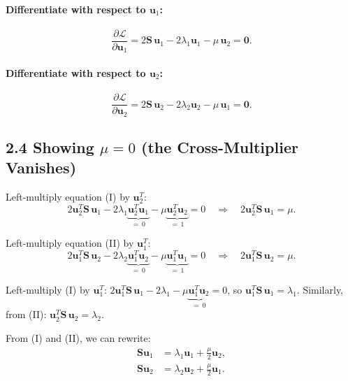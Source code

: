 \documentclass[11pt]{article}
\begin{document}
\paragraph{Differentiate with respect to $\boldsymbol{u}_1$:}
\[
\frac{\partial\mathcal{L}}{\partial\boldsymbol{u}_1}
= 2\boldsymbol{S}\,\boldsymbol{u}_1 - 2\lambda_1\boldsymbol{u}_1 - \mu\,\boldsymbol{u}_2
= \boldsymbol{0}.
\tag{I}
\]

\paragraph{Differentiate with respect to $\boldsymbol{u}_2$:}
\[
\frac{\partial\mathcal{L}}{\partial\boldsymbol{u}_2}
= 2\boldsymbol{S}\,\boldsymbol{u}_2 - 2\lambda_2\boldsymbol{u}_2 - \mu\,\boldsymbol{u}_1
= \boldsymbol{0}.
\tag{II}
\]

\subsection*{2.4 Showing $\mu = 0$ (the Cross-Multiplier Vanishes)}

Left-multiply equation (I) by $\boldsymbol{u}_2^T$:
\[
2\boldsymbol{u}_2^T\boldsymbol{S}\,\boldsymbol{u}_1
- 2\lambda_1\underbrace{\boldsymbol{u}_2^T\boldsymbol{u}_1}_{=\,0}
- \mu\underbrace{\boldsymbol{u}_2^T\boldsymbol{u}_2}_{=\,1} = 0
\quad\Longrightarrow\quad
2\boldsymbol{u}_2^T\boldsymbol{S}\,\boldsymbol{u}_1 = \mu.
\tag{III}
\]

Left-multiply equation (II) by $\boldsymbol{u}_1^T$:
\[
2\boldsymbol{u}_1^T\boldsymbol{S}\,\boldsymbol{u}_2
- 2\lambda_2\underbrace{\boldsymbol{u}_1^T\boldsymbol{u}_2}_{=\,0}
- \mu\underbrace{\boldsymbol{u}_1^T\boldsymbol{u}_1}_{=\,1} = 0
\quad\Longrightarrow\quad
2\boldsymbol{u}_1^T\boldsymbol{S}\,\boldsymbol{u}_2 = \mu.
\tag{IV}
\]

Left-multiply (I) by $\boldsymbol{u}_1^T$:
$2\boldsymbol{u}_1^T\boldsymbol{S}\,\boldsymbol{u}_1
- 2\lambda_1 - \mu\underbrace{\boldsymbol{u}_1^T\boldsymbol{u}_2}_{=\,0} = 0$,
so $\boldsymbol{u}_1^T\boldsymbol{S}\,\boldsymbol{u}_1 = \lambda_1$.
Similarly, from (II): $\boldsymbol{u}_2^T\boldsymbol{S}\,\boldsymbol{u}_2 = \lambda_2$.

From (I) and (II), we can rewrite:
\begin{align}
\boldsymbol{S}\boldsymbol{u}_1 &= \lambda_1\boldsymbol{u}_1 + \tfrac{\mu}{2}\boldsymbol{u}_2, \label{eq:su1}\\
\boldsymbol{S}\boldsymbol{u}_2 &= \lambda_2\boldsymbol{u}_2 + \tfrac{\mu}{2}\boldsymbol{u}_1. \label{eq:su2}
\end{align}
\end{document}
